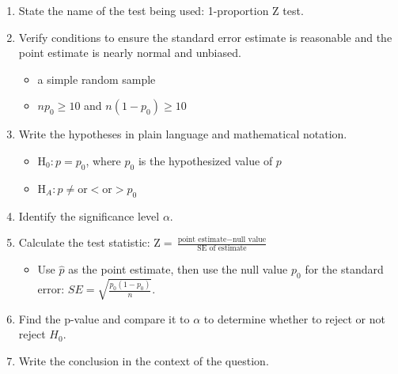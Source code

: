 \begin{termBox}{
\begin{enumerate}
\setlength{\itemsep}{0mm}
\item State the name of the test being used: 1-proportion Z test.
\item Verify conditions to ensure the standard error estimate is reasonable and the point estimate is nearly normal and unbiased.\vspace{-1.5mm}
\begin{itemize}
\setlength{\itemsep}{0mm}
\item a simple random sample
\item $np_0\geq10$ and $n(1-p_0)\geq10$
\end{itemize}
\item Write the hypotheses in plain language and mathematical notation.\vspace{-1.5mm}
\begin{itemize}
\setlength{\itemsep}{0mm}
\item H$_0: p = p_0$, where $p_0$ is the hypothesized value of $p$
\item H$_A: p \ne \text{or} < \text{or} > p_0$
\end{itemize}
\item Identify the significance level $\alpha$.
\vspace{-1.5mm}
\item Calculate the test statistic: $\text{Z} = \frac{\text{point estimate} - \text{null value}}{\text{SE of estimate}}$
\begin{itemize}
\item Use $\hat{p}$ as the point estimate, then use the null value $p_0$ for the standard error: $SE = \sqrt{\frac{p_0(1-p_0)}{n}}$.
\end{itemize}
\item Find the p-value and compare it to $\alpha$ to determine whether to reject or not reject $H_0$.
\item Write the conclusion in the context of the question.
\end{enumerate}}
\end{termBox}

